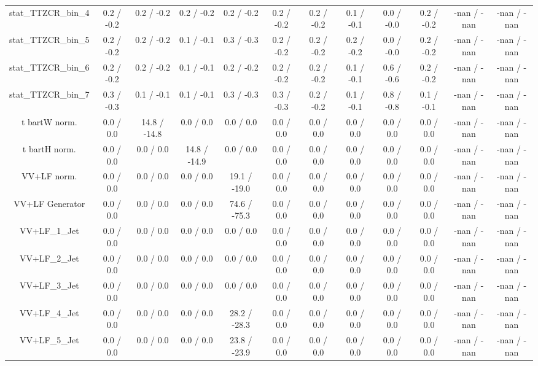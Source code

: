 \begin{table}[htbp]
\begin{center}
\begin{tabular}{|c|c|c|c|c|c|c|c|c|c|c|c|}
 stat_TTZCR_bin_4 & 0.2 / -0.2 & 0.2 / -0.2 & 0.2 / -0.2 & 0.2 / -0.2 & 0.2 / -0.2 & 0.2 / -0.2 & 0.1 / -0.1 & 0.0 / -0.0 & 0.2 / -0.2 & -nan / -nan & -nan / -nan \\ 
 stat_TTZCR_bin_5 & 0.2 / -0.2 & 0.2 / -0.2 & 0.1 / -0.1 & 0.3 / -0.3 & 0.2 / -0.2 & 0.2 / -0.2 & 0.2 / -0.2 & 0.0 / -0.0 & 0.2 / -0.2 & -nan / -nan & -nan / -nan \\ 
 stat_TTZCR_bin_6 & 0.2 / -0.2 & 0.2 / -0.2 & 0.1 / -0.1 & 0.2 / -0.2 & 0.2 / -0.2 & 0.2 / -0.2 & 0.1 / -0.1 & 0.6 / -0.6 & 0.2 / -0.2 & -nan / -nan & -nan / -nan \\ 
 stat_TTZCR_bin_7 & 0.3 / -0.3 & 0.1 / -0.1 & 0.1 / -0.1 & 0.3 / -0.3 & 0.3 / -0.3 & 0.2 / -0.2 & 0.1 / -0.1 & 0.8 / -0.8 & 0.1 / -0.1 & -nan / -nan & -nan / -nan \\ 
  t bar{t}W norm. & 0.0 / 0.0 & 14.8 / -14.8 & 0.0 / 0.0 & 0.0 / 0.0 & 0.0 / 0.0 & 0.0 / 0.0 & 0.0 / 0.0 & 0.0 / 0.0 & 0.0 / 0.0 & -nan / -nan & -nan / -nan \\ 
  t bar{t}H norm. & 0.0 / 0.0 & 0.0 / 0.0 & 14.8 / -14.9 & 0.0 / 0.0 & 0.0 / 0.0 & 0.0 / 0.0 & 0.0 / 0.0 & 0.0 / 0.0 & 0.0 / 0.0 & -nan / -nan & -nan / -nan \\ 
  VV+LF norm. & 0.0 / 0.0 & 0.0 / 0.0 & 0.0 / 0.0 & 19.1 / -19.0 & 0.0 / 0.0 & 0.0 / 0.0 & 0.0 / 0.0 & 0.0 / 0.0 & 0.0 / 0.0 & -nan / -nan & -nan / -nan \\ 
  VV+LF Generator & 0.0 / 0.0 & 0.0 / 0.0 & 0.0 / 0.0 & 74.6 / -75.3 & 0.0 / 0.0 & 0.0 / 0.0 & 0.0 / 0.0 & 0.0 / 0.0 & 0.0 / 0.0 & -nan / -nan & -nan / -nan \\ 
  VV+LF_1_Jet & 0.0 / 0.0 & 0.0 / 0.0 & 0.0 / 0.0 & 0.0 / 0.0 & 0.0 / 0.0 & 0.0 / 0.0 & 0.0 / 0.0 & 0.0 / 0.0 & 0.0 / 0.0 & -nan / -nan & -nan / -nan \\ 
  VV+LF_2_Jet & 0.0 / 0.0 & 0.0 / 0.0 & 0.0 / 0.0 & 0.0 / 0.0 & 0.0 / 0.0 & 0.0 / 0.0 & 0.0 / 0.0 & 0.0 / 0.0 & 0.0 / 0.0 & -nan / -nan & -nan / -nan \\ 
  VV+LF_3_Jet & 0.0 / 0.0 & 0.0 / 0.0 & 0.0 / 0.0 & 0.0 / 0.0 & 0.0 / 0.0 & 0.0 / 0.0 & 0.0 / 0.0 & 0.0 / 0.0 & 0.0 / 0.0 & -nan / -nan & -nan / -nan \\ 
  VV+LF_4_Jet & 0.0 / 0.0 & 0.0 / 0.0 & 0.0 / 0.0 & 28.2 / -28.3 & 0.0 / 0.0 & 0.0 / 0.0 & 0.0 / 0.0 & 0.0 / 0.0 & 0.0 / 0.0 & -nan / -nan & -nan / -nan \\ 
  VV+LF_5_Jet & 0.0 / 0.0 & 0.0 / 0.0 & 0.0 / 0.0 & 23.8 / -23.9 & 0.0 / 0.0 & 0.0 / 0.0 & 0.0 / 0.0 & 0.0 / 0.0 & 0.0 / 0.0 & -nan / -nan & -nan / -nan \\ 

\end{tabular}
\end{center}
\end{table}
